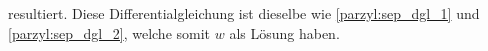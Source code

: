 resultiert. Diese Differentialgleichung ist dieselbe wie 
\eqref{parzyl:sep_dgl_1} und \eqref{parzyl:sep_dgl_2}, welche somit
$w$ als Lösung haben.
